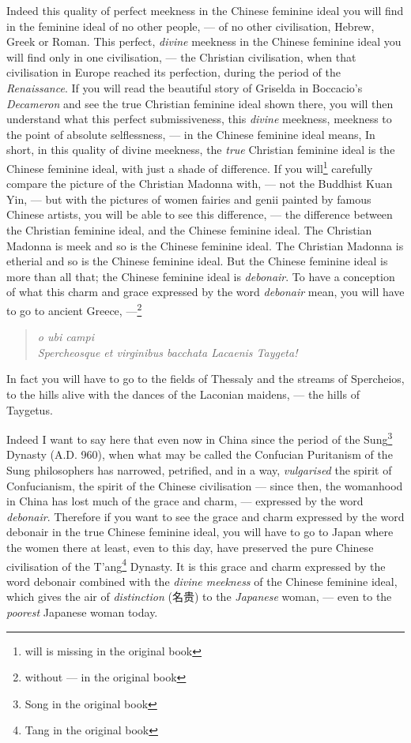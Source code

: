 Indeed this quality of perfect meekness in the Chinese feminine ideal you will find in the feminine ideal of no other people, --- of no other civilisation, Hebrew, Greek or Roman.
This perfect, \emph{divine} meekness in the Chinese feminine ideal you will find only in one civilisation, --- the Christian civilisation, when that civilisation in Europe reached its perfection, during the period of the \emph{Renaissance}.
If you will read the beautiful story of Griselda in Boccacio's \emph{Decameron} and see the true Christian feminine ideal shown there, you will then understand what this perfect submissiveness, this \emph{divine} meekness, meekness to the point of absolute selflessness, --- in the Chinese feminine ideal means, In short, in this quality of divine meekness, the \emph{true} Christian feminine ideal is the Chinese feminine ideal, with just a shade of difference.
If you will\footnote{will is missing in the original book} carefully compare the picture of the Christian Madonna with, --- not the Buddhist Kuan Yin, --- but with the pictures of women fairies and genii painted by famous Chinese artists, you will be able to see this difference, --- the difference between the Christian feminine ideal, and the Chinese feminine ideal.
The Christian Madonna is meek and so is the Chinese feminine ideal.
The Christian Madonna is etherial and so is the Chinese feminine ideal.
But the Chinese feminine ideal is more than all that; the Chinese feminine ideal is \emph{debonair}.
To have a conception of what this charm and grace expressed by the word \emph{debonair} mean, you will have to go to ancient Greece, ---\footnote{without --- in the original book}
\begin{quote}
   \emph {\hfill o ubi campi\\ Spercheosque et virginibus bacchata Lacaenis Taygeta! \hfill}
\end{quote}

In fact you will have to go to the fields of Thessaly and the streams of Spercheios, to the hills alive with the dances of the Laconian maidens, --- the hills of Taygetus.

Indeed I want to say here that even now in China since the period of the Sung\footnote{Song in the original book} Dynasty (A.D. 960), when what  may be called the Confucian Puritanism of the Sung philosophers has narrowed, petrified, and in a way, \emph{vulgarised} the spirit of Confucianism, the spirit of the Chinese civilisation --- since then, the womanhood in China has lost much of the grace and charm, --- expressed by the word \emph{debonair}.
Therefore if you want to see the grace and charm expressed by the word debonair in the true Chinese feminine ideal, you will have to go to Japan where the women there at least, even to this day, have preserved the pure Chinese civilisation of the T'ang\footnote{Tang in the original book} Dynasty.
It is this grace and charm expressed by the word debonair combined with the \emph{divine meekness} of the Chinese feminine ideal, which gives the air of \emph{distinction} (名贵) to the \emph{Japanese} woman, --- even to the \emph{poorest} Japanese woman today.

